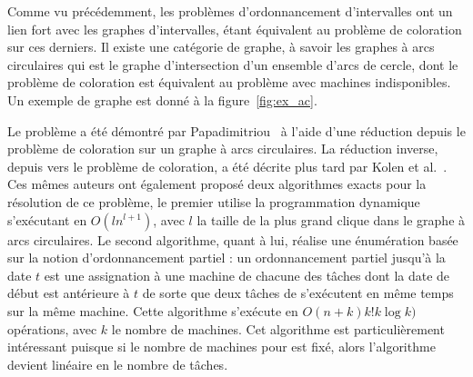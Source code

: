 \documentclass[a4paper,11pt]{report}
\begin{document}
Comme vu précédemment, les problèmes d'ordonnancement d'intervalles ont un lien fort avec les
graphes d'intervalles, \bisched{} étant équivalent au problème de coloration sur ces derniers. Il
existe une catégorie de graphe, à savoir les graphes à arcs circulaires qui est le
graphe d'intersection d'un ensemble d'arcs de cercle, dont le problème de coloration est équivalent
au problème avec machines indisponibles. Un exemple de graphe est donné à la figure~\ref{fig:ex_ac}.

Le problème \isma{} a été démontré \npc par
Papadimitriou~\cite{papadimitriou1982private} à l'aide d'une réduction depuis le problème de
coloration sur un graphe à arcs circulaires. La réduction inverse, depuis \isma{} vers le problème de
coloration, a été décrite plus tard par Kolen et al.~\cite{kolen2007interval}. Ces mêmes auteurs ont également
proposé deux algorithmes exacts pour la résolution de ce problème, le premier utilise la
programmation dynamique s'exécutant en $O(ln^{l+1})$, avec $l$ la taille de la plus grand clique dans
le graphe à arcs circulaires. Le second algorithme, quant à lui, réalise une énumération  basée sur
la notion d'ordonnancement partiel : un ordonnancement partiel jusqu'à la date $t$ est une
assignation à une machine de chacune des tâches dont la date de début est antérieure à $t$ de sorte
que deux tâches de s'exécutent en même temps sur la même machine. Cette algorithme s'exécute en
$O\left( n+k \right)k!k \log k)$ opérations, avec $k$ le nombre de machines. Cet algorithme est
particulièrement intéressant puisque si le nombre de machines pour \isma{} est fixé, alors l'algorithme
devient linéaire en le nombre de tâches.
\end{document}
